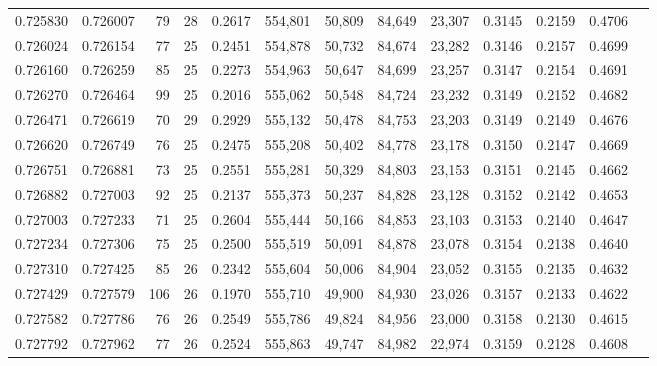 \begin{tabular}{rrrrrrrrrrrrr}
0.725830 & 0.726007 &    79 &  28 &                                     0.2617 & 554,801 &  50,809 &  84,649 &  23,307 & 0.3145 & 0.2159 & 0.4706 \\
0.726024 & 0.726154 &    77 &  25 &                                     0.2451 & 554,878 &  50,732 &  84,674 &  23,282 & 0.3146 & 0.2157 & 0.4699 \\
0.726160 & 0.726259 &    85 &  25 &                                     0.2273 & 554,963 &  50,647 &  84,699 &  23,257 & 0.3147 & 0.2154 & 0.4691 \\
0.726270 & 0.726464 &    99 &  25 &                                     0.2016 & 555,062 &  50,548 &  84,724 &  23,232 & 0.3149 & 0.2152 & 0.4682 \\
0.726471 & 0.726619 &    70 &  29 &                                     0.2929 & 555,132 &  50,478 &  84,753 &  23,203 & 0.3149 & 0.2149 & 0.4676 \\
0.726620 & 0.726749 &    76 &  25 &                                     0.2475 & 555,208 &  50,402 &  84,778 &  23,178 & 0.3150 & 0.2147 & 0.4669 \\
0.726751 & 0.726881 &    73 &  25 &                                     0.2551 & 555,281 &  50,329 &  84,803 &  23,153 & 0.3151 & 0.2145 & 0.4662 \\
0.726882 & 0.727003 &    92 &  25 &                                     0.2137 & 555,373 &  50,237 &  84,828 &  23,128 & 0.3152 & 0.2142 & 0.4653 \\
0.727003 & 0.727233 &    71 &  25 &                                     0.2604 & 555,444 &  50,166 &  84,853 &  23,103 & 0.3153 & 0.2140 & 0.4647 \\
0.727234 & 0.727306 &    75 &  25 &                                     0.2500 & 555,519 &  50,091 &  84,878 &  23,078 & 0.3154 & 0.2138 & 0.4640 \\
0.727310 & 0.727425 &    85 &  26 &                                     0.2342 & 555,604 &  50,006 &  84,904 &  23,052 & 0.3155 & 0.2135 & 0.4632 \\
0.727429 & 0.727579 &   106 &  26 &                                     0.1970 & 555,710 &  49,900 &  84,930 &  23,026 & 0.3157 & 0.2133 & 0.4622 \\
0.727582 & 0.727786 &    76 &  26 &                                     0.2549 & 555,786 &  49,824 &  84,956 &  23,000 & 0.3158 & 0.2130 & 0.4615 \\
0.727792 & 0.727962 &    77 &  26 &                                     0.2524 & 555,863 &  49,747 &  84,982 &  22,974 & 0.3159 & 0.2128 & 0.4608 \\

\end{tabular}
